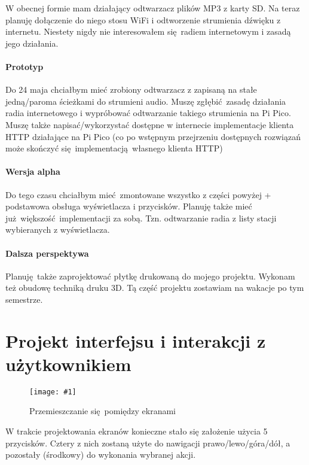 \documentclass[12pt]{article}
\newcommand{\imgcustomsize}[3]{
	\begin{figure}[H]
		\centering
		\texttt{[image: \#1]}
		\caption{#2}
	\end{figure}
}
\begin{document}
		W obecnej formie mam działający odtwarzacz plików MP3 z karty SD. Na teraz planuję dołączenie do niego stosu WiFi i odtworzenie strumienia dźwięku z internetu. Niestety nigdy nie interesowałem się radiem internetowym i zasadą jego działania.
		
		\paragraph{Prototyp}
		Do 24 maja chciałbym mieć zrobiony odtwarzacz z zapisaną na stałe jedną/paroma ścieżkami do strumieni audio. Muszę zgłębić zasadę działania radia internetowego i wypróbować odtwarzanie takiego strumienia na Pi Pico. Muszę także napisać/wykorzystać dostępne w internecie implementacje klienta HTTP działające na Pi Pico (co po wstępnym przejrzeniu dostępnych rozwiązań może skończyć się implementacją własnego klienta HTTP)
		
		\paragraph{Wersja alpha}
		Do tego czasu chciałbym mieć zmontowane wszystko z części powyżej + podstawowa obsługa wyświetlacza i przycisków. Planuję także mieć już większość implementacji za sobą. Tzn. odtwarzanie radia z listy stacji wybieranych z wyświetlacza.
		
		\paragraph{Dalsza perspektywa}
		Planuję także zaprojektować płytkę drukowaną do mojego projektu. Wykonam też obudowę techniką druku 3D. Tą część projektu zostawiam na wakacje po tym semestrze.
		
	\section{Projekt interfejsu i interakcji z użytkownikiem}
	\imgcustomsize{interface/1flow}{Przemieszczanie się pomiędzy ekranami}{0.9}
	W trakcie projektowania ekranów konieczne stało się założenie użycia 5 przycisków. Cztery z nich zostaną użyte do nawigacji prawo/lewo/góra/dół, a pozostały (środkowy) do wykonania wybranej akcji.
		 
	
	
\end{document}
